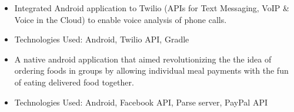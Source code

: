 \documentclass[10pt,a4paper]{altacv}
\begin{document}
\divider

\begin{itemize}
\item Integrated Android application to Twilio (APIs for Text Messaging, VoIP \& Voice in the Cloud) to enable voice analysis of phone calls.
\item Technologies Used: Android, Twilio API, Gradle
\end{itemize}




{\faLaptop} 

{\faTerminal} 

\begin{itemize}
\item A native android application that aimed revolutionizing the the idea of ordering foods in groups by allowing individual meal payments with the fun of eating delivered food together. 
\item Technologies Used: Android, Facebook API, Parse server, PayPal API
\end{itemize}
\end{document}
